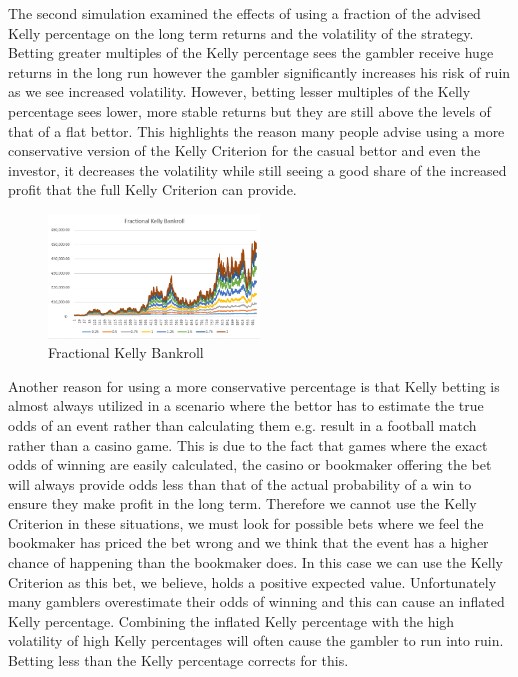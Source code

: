 \documentclass[12pt]{article}
\begin{document}
The second simulation examined the effects of using a fraction of the advised Kelly percentage on the long term returns and the volatility of the strategy. Betting greater multiples of the Kelly percentage sees the gambler receive huge returns in the long run however the gambler significantly increases his risk of ruin as we see increased volatility. However, betting lesser multiples of the Kelly percentage sees lower, more stable returns but they are still above the levels of that of a flat bettor. This highlights the reason many people advise using a more conservative version of the Kelly Criterion for the casual bettor and even the investor, it decreases the volatility while still seeing a good share of the increased profit that the full Kelly Criterion can provide.

\begin{figure}[H]
\centering
\includegraphics[width=0.5\textwidth]{frac_kelly.PNG}
\caption{Fractional Kelly Bankroll}
\end{figure}

Another reason for using a more conservative percentage is that Kelly betting is almost always utilized in a scenario where the bettor has to estimate the true odds of an event rather than calculating them e.g. result in a football match rather than a casino game. This is due to the fact that games where the exact odds of winning are easily calculated, the casino or bookmaker offering the bet will always provide odds less than that of the actual probability of a win to ensure they make profit in the long term. Therefore we cannot use the Kelly Criterion in these situations, we must look for possible bets where we feel the bookmaker has priced the bet wrong and we think that the event has a higher chance of happening than the bookmaker does. In this case we can use the Kelly Criterion as this bet, we believe, holds a positive expected value. Unfortunately many gamblers overestimate their odds of winning and this can cause an inflated Kelly percentage. Combining the inflated Kelly percentage with the high volatility of high Kelly percentages will often cause the gambler to run into ruin. Betting less than the Kelly percentage corrects for this.
\end{document}
